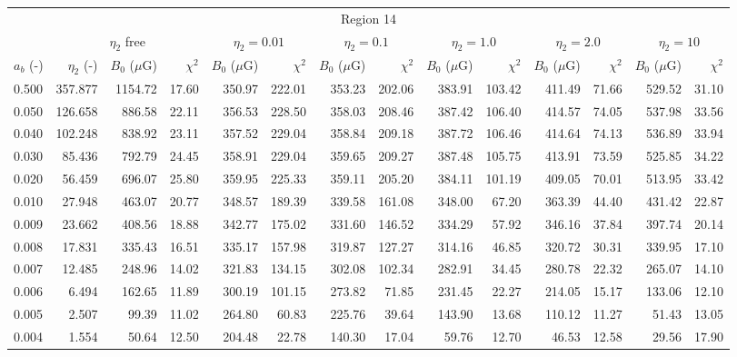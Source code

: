 \begin{tabular}{@{}lrrrrrrrrrrrrr@{}}
\toprule
\multicolumn{14}{c}{Region 14} \\
\cmidrule{1-14}
{} & \multicolumn{3}{c}{$\eta_2$ free} & \multicolumn{2}{c}{$\eta_2 = 0.01$}
   & \multicolumn{2}{c}{$\eta_2 = 0.1$} & \multicolumn{2}{c}{$\eta_2 = 1.0$}
   & \multicolumn{2}{c}{$\eta_2 = 2.0$} & \multicolumn{2}{c}{$\eta_2 = 10$} \\
\cmidrule(lr){2-4} \cmidrule(lr){5-6} \cmidrule(lr){7-8} \cmidrule(lr){9-10}
    \cmidrule(lr){11-12} \cmidrule(lr){13-14}
$a_b$ (-) & $\eta_2$ (-) & $B_0$ ($\mu$G) & $\chi^2$
& $B_0$ ($\mu$G) & $\chi^2$ & $B_0$ ($\mu$G) & $\chi^2$
& $B_0$ ($\mu$G) & $\chi^2$ & $B_0$ ($\mu$G) & $\chi^2$
& $B_0$ ($\mu$G) & $\chi^2$ \\
\cmidrule{1-14}
0.500 & 357.877 & 1154.72 & 17.60 & 350.97 & 222.01 & 353.23 & 202.06 & 383.91 & 103.42 & 411.49 & 71.66 & 529.52 & 31.10 \\
0.050 & 126.658 & 886.58 & 22.11 & 356.53 & 228.50 & 358.03 & 208.46 & 387.42 & 106.40 & 414.57 & 74.05 & 537.98 & 33.56 \\
0.040 & 102.248 & 838.92 & 23.11 & 357.52 & 229.04 & 358.84 & 209.18 & 387.72 & 106.46 & 414.64 & 74.13 & 536.89 & 33.94 \\
0.030 & 85.436 & 792.79 & 24.45 & 358.91 & 229.04 & 359.65 & 209.27 & 387.48 & 105.75 & 413.91 & 73.59 & 525.85 & 34.22 \\
0.020 & 56.459 & 696.07 & 25.80 & 359.95 & 225.33 & 359.11 & 205.20 & 384.11 & 101.19 & 409.05 & 70.01 & 513.95 & 33.42 \\
0.010 & 27.948 & 463.07 & 20.77 & 348.57 & 189.39 & 339.58 & 161.08 & 348.00 & 67.20 & 363.39 & 44.40 & 431.42 & 22.87 \\
0.009 & 23.662 & 408.56 & 18.88 & 342.77 & 175.02 & 331.60 & 146.52 & 334.29 & 57.92 & 346.16 & 37.84 & 397.74 & 20.14 \\
0.008 & 17.831 & 335.43 & 16.51 & 335.17 & 157.98 & 319.87 & 127.27 & 314.16 & 46.85 & 320.72 & 30.31 & 339.95 & 17.10 \\
0.007 & 12.485 & 248.96 & 14.02 & 321.83 & 134.15 & 302.08 & 102.34 & 282.91 & 34.45 & 280.78 & 22.32 & 265.07 & 14.10 \\
0.006 & 6.494 & 162.65 & 11.89 & 300.19 & 101.15 & 273.82 & 71.85 & 231.45 & 22.27 & 214.05 & 15.17 & 133.06 & 12.10 \\
0.005 & 2.507 & 99.39 & 11.02 & 264.80 & 60.83 & 225.76 & 39.64 & 143.90 & 13.68 & 110.12 & 11.27 & 51.43 & 13.05 \\
0.004 & 1.554 & 50.64 & 12.50 & 204.48 & 22.78 & 140.30 & 17.04 & 59.76 & 12.70 & 46.53 & 12.58 & 29.56 & 17.90 \\


\end{tabular}
